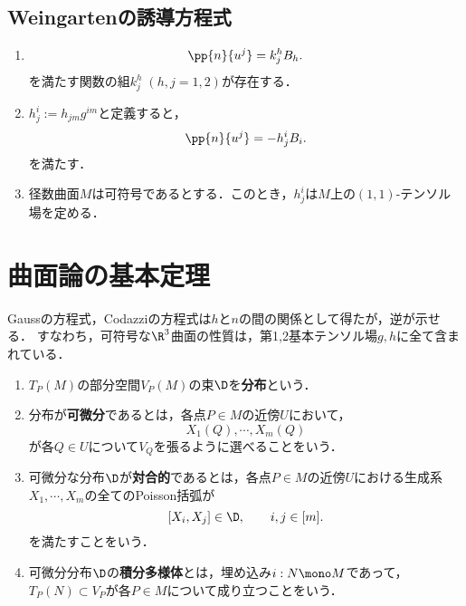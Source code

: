 \documentclass[uplatex,dvipdfmx]{jsreport}
\begin{document}
\subsection{Weingartenの誘導方程式}

\begin{proposition}\mbox{}
    \begin{enumerate}
        \item \[\pp{n}{u^j}=k^h_jB_h.\]
        を満たす関数の組$k_j^h\;(h,j=1,2)$が存在する．
        \item $h^i_j:=h_{jm}g^{im}$と定義すると，
        \[\pp{n}{u^j}=-h^i_jB_i.\]
        を満たす．
        \item 径数曲面$M$は可符号であるとする．このとき，$h^i_j$は$M$上の$(1,1)$-テンソル場を定める．
    \end{enumerate}
\end{proposition}

\section{曲面論の基本定理}

\begin{tcolorbox}[colframe=ForestGreen, colback=ForestGreen!10!white,breakable,colbacktitle=ForestGreen!40!white,coltitle=black,fonttitle=\bfseries\sffamily,
title=]
    Gaussの方程式，Codazziの方程式は$h$と$n$の間の関係として得たが，逆が示せる．
    すなわち，可符号な$\R^3$曲面の性質は，第1,2基本テンソル場$g,h$に全て含まれている．
\end{tcolorbox}

\begin{definition}\mbox{}
    \begin{enumerate}
        \item $T_P(M)$の部分空間$V_P(M)$の束$\D$を\textbf{分布}という．
        \item 分布が\textbf{可微分}であるとは，各点$P\in M$の近傍$U$において，
        \[X_1(Q),\cdots,X_m(Q)\]
        が各$Q\in U$について$V_Q$を張るように選べることをいう．
        \item 可微分な分布$\D$が\textbf{対合的}であるとは，各点$P\in M$の近傍$U$における生成系$X_1,\cdots,X_m$の全てのPoisson括弧が
        \[[X_i,X_j]\in\D,\qquad i,j\in[m].\]
        を満たすことをいう．
        \item 可微分分布$\D$の\textbf{積分多様体}とは，埋め込み$i:N\mono M$であって，$T_P(N)\subset V_P$が各$P\in M$について成り立つことをいう．
    \end{enumerate}
\end{definition}
\end{document}
